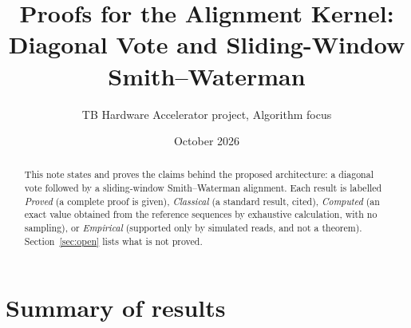 \documentclass[11pt]{article}
\title{Proofs for the Alignment Kernel:\\
Diagonal Vote and Sliding-Window Smith--Waterman}
\author{TB Hardware Accelerator project, Algorithm focus}
\date{October 2026}
\theoremstyle{plain}
\theoremstyle{definition}
\theoremstyle{remark}
\begin{document}
\maketitle

\begin{abstract}
This note states and proves the claims behind the proposed architecture: a
diagonal vote followed by a sliding-window Smith--Waterman alignment. Each
result is labelled \emph{Proved} (a complete proof is given), \emph{Classical}
(a standard result, cited), \emph{Computed} (an exact value obtained from the
reference sequences by exhaustive calculation, with no sampling), or
\emph{Empirical} (supported only by simulated reads, and not a theorem).
Section~\ref{sec:open} lists what is not proved.
\end{abstract}

\section*{Summary of results}
\end{document}
